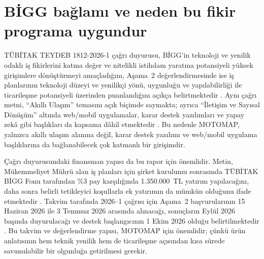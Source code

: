 \documentclass[11pt,a4paper]{article}
\begin{document}
\section{BİGG bağlamı ve neden bu fikir programa uygundur}

TÜBİTAK TEYDEB 1812-2026-1 çağrı duyurusu, BİGG'in teknoloji ve yenilik odaklı iş fikirlerini katma değer ve nitelikli istihdam yaratma potansiyeli yüksek girişimlere dönüştürmeyi amaçladığını, Aşama~2 değerlendirmesinde ise iş planlarının teknoloji düzeyi ve yenilikçi yönü, uygunluğu ve yapılabilirliği ile ticarileşme potansiyeli üzerinden puanlandığını açıkça belirtmektedir \cite{u3}. Aynı çağrı metni, ``Akıllı Ulaşım'' temasını açık biçimde saymakta; ayrıca ``İletişim ve Sayısal Dönüşüm'' altında web/mobil uygulamalar, karar destek yazılımları ve yapay zekâ gibi başlıkları da kapsama dâhil etmektedir \cite{u3}. Bu nedenle MOTOMAP, yalnızca akıllı ulaşım alanına değil, karar destek yazılımı ve web/mobil uygulama başlıklarına da bağlanabilecek çok katmanlı bir girişimdir.

Çağrı duyurusundaki finansman yapısı da bu rapor için önemlidir. Metin, Mükemmeliyet Mührü alan iş planları için şirket kurulumu sonrasında TÜBİTAK BİGG Fonu tarafından \%3 pay karşılığında 1.350.000~TL yatırım yapılacağını, daha sonra belirli tetikleyici koşullarla ek yatırımın da mümkün olduğunu ifade etmektedir \cite{u3}. Takvim tarafında 2026--1 çağrısı için Aşama~2 başvurularının 15 Haziran 2026 ile 3 Temmuz 2026 arasında alınacağı, sonuçların Eylül 2026 başında duyurulacağı ve destek başlangıcının 1 Ekim 2026 olduğu belirtilmektedir \cite{u3}. Bu takvim ve değerlendirme yapısı, MOTOMAP için önemlidir; çünkü ürün anlatısının hem teknik yenilik hem de ticarileşme açısından kısa sürede savunulabilir bir olgunluğa getirilmesi gerekir.
\end{document}

